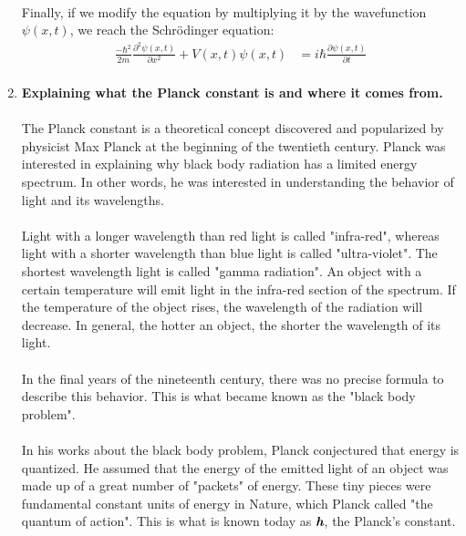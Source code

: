 \documentclass[letter]{article}
\begin{document}
\begin{enumerate}
    \paragraph{}Finally, if we modify the equation by multiplying it by the wavefunction $\psi(x,t)$, we reach the Schrödinger equation:
    \begin{equation}
        \begin{split}
            \frac{-\hbar^2}{2m}\frac{\partial^2\psi(x,t)}{\partial x^2}+V(x,t)\psi(x,t)
            &= i\hbar \frac{\partial \psi(x,t)}{\partial t}\\
        \end{split}
    \end{equation}
    \newpage
    \item \textbf{Explaining what the Planck constant is and where it comes from.}
    \paragraph{} The Planck constant is a theoretical concept discovered and popularized by physicist Max Planck at the beginning of the twentieth century. 
    Planck was interested in explaining why black body radiation has a limited energy spectrum. In other words, he was interested in understanding the behavior of light and its wavelengths.
    \paragraph{}Light with a longer wavelength than red light is called "infra-red", whereas light with a shorter wavelength than blue light is called "ultra-violet". The shortest wavelength light is called "gamma radiation". An object with a certain temperature will emit light in the infra-red section of the spectrum. If the temperature of the object rises, the wavelength of the radiation will decrease. In general, the hotter an object, the shorter the wavelength of its light. 
    \paragraph{}In the final years of the nineteenth century, there was no precise formula to describe this behavior. This is what became known as the "black body problem".
    \paragraph{}In his works about the black body problem, Planck conjectured that energy is quantized. He assumed that the energy of the emitted light of an object was made up of a great number of "packets" of energy. These tiny pieces were fundamental constant units of energy in Nature, which Planck called "the quantum of action". This is what is known today as $\textit{\textbf{h}}$, the Planck's constant.

\end{enumerate}
\end{document}
